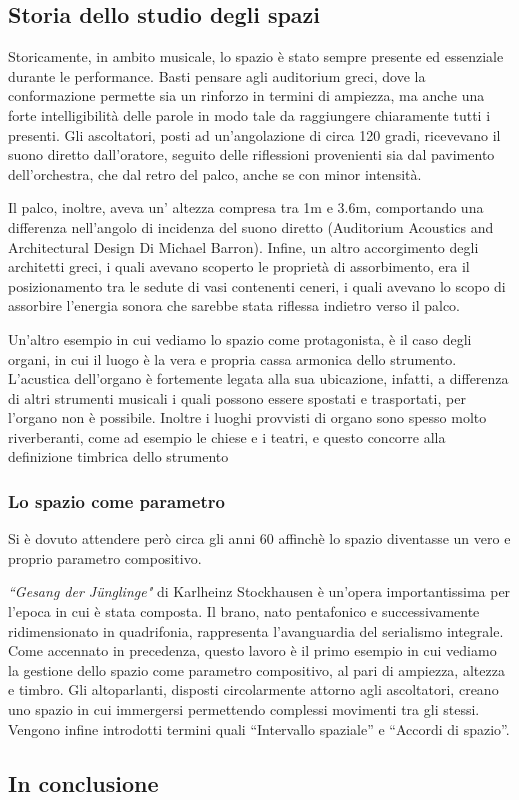 \subsection{Storia dello studio degli spazi}
Storicamente, in ambito musicale, lo spazio è stato sempre presente ed essenziale durante le performance. Basti pensare agli auditorium greci, dove la conformazione permette sia un rinforzo in termini di ampiezza, ma anche una forte intelligibilità delle parole in modo tale da raggiungere chiaramente tutti i presenti.
Gli ascoltatori, posti ad un'angolazione di circa 120 gradi, ricevevano il suono diretto dall’oratore, seguito delle riflessioni provenienti sia dal pavimento dell’orchestra, che dal retro del palco, anche se con minor intensità.

Il palco, inoltre, aveva un’ altezza compresa tra 1m e 3.6m, comportando una differenza nell’angolo di incidenza del suono diretto (Auditorium Acoustics and Architectural Design Di Michael Barron).
Infine, un altro accorgimento degli architetti greci, i quali avevano scoperto le proprietà di assorbimento, era il posizionamento tra le sedute di vasi contenenti ceneri, i quali avevano lo scopo di assorbire l’energia sonora che sarebbe stata riflessa indietro verso il palco.

Un’altro esempio in cui vediamo lo spazio come protagonista, è il caso degli organi, in cui il luogo è la vera e propria cassa armonica dello strumento.
L’acustica dell’organo è fortemente legata alla sua ubicazione, infatti, a differenza di altri strumenti musicali i quali possono essere spostati e trasportati, per l’organo non è possibile. Inoltre i luoghi provvisti di organo sono spesso molto riverberanti, come ad esempio le chiese e i teatri, e questo concorre alla definizione timbrica dello strumento


\subsubsection{Lo spazio come parametro}
Si è dovuto attendere però circa gli anni 60 affinchè lo spazio diventasse un vero e proprio parametro compositivo.

\emph{“Gesang der Jünglinge"} di Karlheinz Stockhausen è un’opera importantissima per l’epoca in cui è stata composta. Il brano, nato pentafonico e successivamente ridimensionato in quadrifonia, rappresenta l’avanguardia del serialismo integrale. Come accennato in precedenza, questo lavoro è il primo esempio in cui vediamo la gestione dello spazio come parametro compositivo, al pari di ampiezza, altezza e timbro.
Gli altoparlanti, disposti circolarmente attorno agli ascoltatori, creano uno spazio in cui immergersi permettendo complessi movimenti tra gli stessi.
Vengono infine introdotti termini quali “Intervallo spaziale” e “Accordi di spazio”.
\subsection{In conclusione}